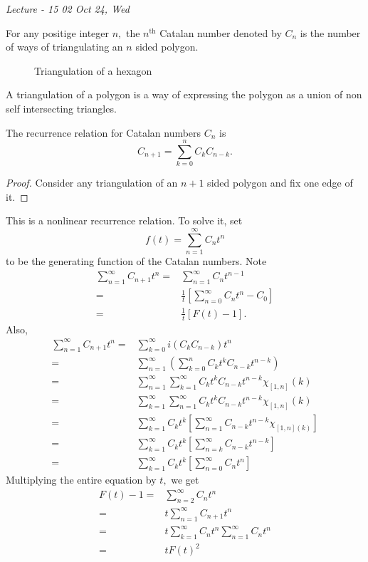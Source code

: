
\noindent
\emph{Lecture - 15 \hfill 02 Oct 24, Wed}

\begin{definition}
	For any positige integer $n,$ the $n^\text{th}$ Catalan number
	denoted by $C_n$ is the number of ways of triangulating an
	$n$ sided polygon.
\end{definition}

\begin{figure}[h]
	\centering
	\caption{Triangulation of a hexagon}
	\label{fig:triangulation-hexagon}
\end{figure}

A triangulation of a polygon is a way of expressing the polygon as
a union of non self intersecting triangles.

The recurrence relation for Catalan numbers $C_n$ is 
$$C_{n+1} = \sum_{k=0}^{n} C_k C_{n-k}.$$
\begin{proof}
	Consider any triangulation of an $n+1$ sided polygon and fix one edge of it.
	
\end{proof}

This is a nonlinear recurrence relation. To solve it, set
$$ f(t) = \sum_{n=1}^{\infty} C_n t^n $$
to be the generating function of the Catalan numbers.
Note 
\begin{align*}
	\sum_{n=1}^{\infty} C_{n+1} t^n
	 ={}& \sum_{n=1}^{\infty} C_n t^{n-1} \\
	 ={}& \frac{1}{t} \left[ \sum_{n=0}^{\infty} C_n t^n - C_0 \right] \\
	 ={}& \frac{1}{t} \left[ F(t) - 1 \right].
\end{align*}
 Also,
 \begin{align*}
	 \sum_{n=1}^{\infty} C_{n+1} t^n
	 ={}& \sum_{k=0}^{\infty} i\left( C_k C_{n-k} \right) t^n \\
	 ={}& \sum_{n=1}^{\infty} \left( \sum_{k=0}^{n} C_k t^k C_{n-k}
	 t^{n-k}\right) \\
	 ={}& \sum_{n=1}^{\infty} \sum_{k=1}^{\infty} 
	 C_k t^k C_{n-k} t^{n-k} \chi_{[1,n]} (k) \\
	 ={}& \sum_{k=1}^{\infty} \sum_{n=1}^{\infty} 
	 C_k t^k C_{n-k} t^{n-k} \chi_{[1,n]} (k) \\
	 ={}& \sum_{k=1}^{\infty} C_k t^k
	 \left[ \sum_{n=1}^{\infty} C_{n-k} t^{n-k} \chi_{[1,n](k)} \right] \\
	 ={}& \sum_{k=1}^{\infty} C_k t^{k} \left[ 
	 \sum_{n=k}^{\infty} C_{n-k} t^{n-k} \right] \\
	 ={}& \sum_{k=1}^{\infty} C_k t^k
	 \left[ \sum_{n=0}^{\infty} C_n t^n \right]
 \end{align*}
 Multiplying the entire equation by $t,$ we get
 \begin{align*}
	 F(t) - 1
	 ={}& \sum_{n=2}^{\infty} C_{n} t^n\\
	 ={}& t \sum_{n=1}^{\infty} C_{n+1}t^n\\
	 ={}& t \sum_{k=1}^{\infty} C_n t^n \sum_{n=1}^{\infty} C_n t^n
	 \\
	 ={}& t F(t)^2
 \end{align*}

